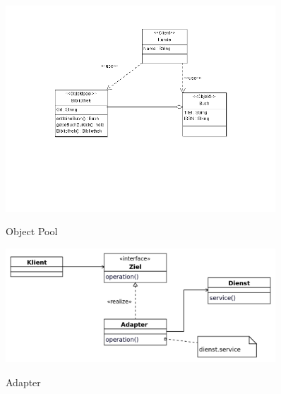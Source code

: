 \begin{figure}[htb]
	\centering
	\begin{minipage}[t]{0.45\linewidth}
		\centering
		\includegraphics[width=0.9\textwidth]{images/object_pool}
		\label{fig:object_pool}
		\caption{Object Pool}
	\end{minipage}%
	\hfill
	\begin{minipage}[t]{0.45\linewidth}
		\centering
		\includegraphics[width=0.9\textwidth]{images/adapter}
		\label{fig:adapter}
		\caption{Adapter}
	\end{minipage}
\end{figure}


